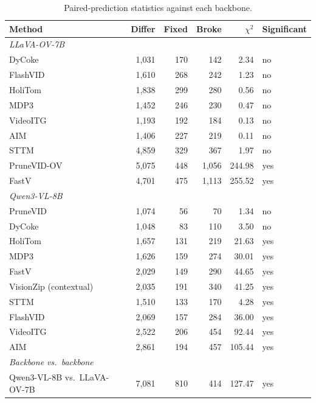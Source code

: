 \documentclass[11pt]{article}
\begin{document}
\begin{table}[H]
  \centering
  \small
  \caption{Paired-prediction statistics against each backbone.}
  \label{tab:verif}
  \begin{tabular}{lrrrrl}
    \toprule
    Method & Differ & Fixed & Broke & $\chi^2$ & Significant \\
    \midrule
    \multicolumn{6}{l}{\textit{LLaVA-OV-7B}} \\
    DyCoke & 1{,}031 & 170 & 142 & 2.34 & no \\
    FlashVID & 1{,}610 & 268 & 242 & 1.23 & no \\
    HoliTom & 1{,}838 & 299 & 280 & 0.56 & no \\
    MDP3 & 1{,}452 & 246 & 230 & 0.47 & no \\
    VideoITG & 1{,}193 & 192 & 184 & 0.13 & no \\
    AIM & 1{,}406 & 227 & 219 & 0.11 & no \\
    STTM & 4{,}859 & 329 & 367 & 1.97 & no \\
    PruneVID-OV & 5{,}075 & 448 & 1{,}056 & 244.98 & yes \\
    FastV & 4{,}701 & 475 & 1{,}113 & 255.52 & yes \\
    \midrule
    \multicolumn{6}{l}{\textit{Qwen3-VL-8B}} \\
    PruneVID & 1{,}074 & 56 & 70 & 1.34 & no \\
    DyCoke & 1{,}048 & 83 & 110 & 3.50 & no \\
    HoliTom & 1{,}657 & 131 & 219 & 21.63 & yes \\
    MDP3 & 1{,}626 & 159 & 274 & 30.01 & yes \\
    FastV & 2{,}029 & 149 & 290 & 44.65 & yes \\
    VisionZip (contextual) & 2{,}035 & 191 & 340 & 41.25 & yes \\
    STTM & 1{,}510 & 133 & 170 & 4.28 & yes \\
    FlashVID & 2{,}069 & 157 & 284 & 36.00 & yes \\
    VideoITG & 2{,}522 & 206 & 454 & 92.44 & yes \\
    AIM & 2{,}861 & 194 & 457 & 105.44 & yes \\
    \midrule
    \multicolumn{6}{l}{\textit{Backbone vs.\ backbone}} \\
    Qwen3-VL-8B vs.\ LLaVA-OV-7B & 7{,}081 & 810 & 414 & 127.47 & yes \\
    \bottomrule
  \end{tabular}
\end{table}
\end{document}
